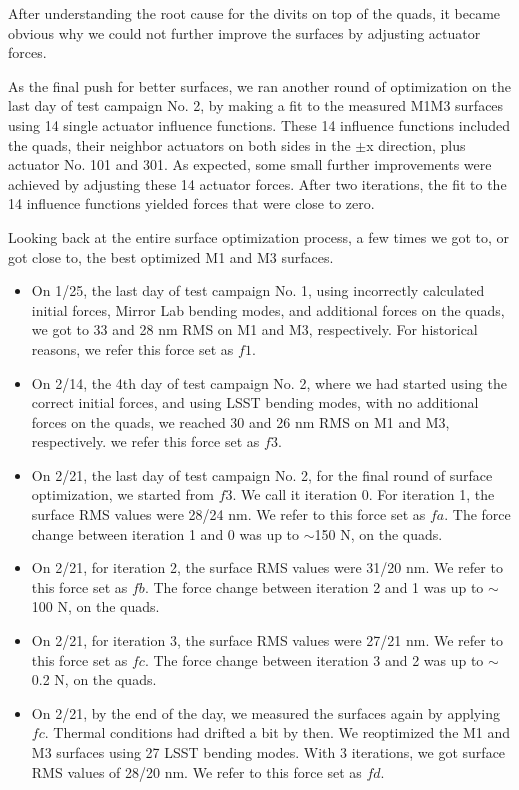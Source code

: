 \documentclass [twoside,openbib,12pt]{article}
\newcommand{\bitm}{\begin{itemize}}
\newcommand{\eitm}{\end{itemize}}
\begin{document}
 After understanding the root cause for the divits on top of the
 quads, it became obvious why we could not further improve the surfaces by
 adjusting actuator forces.
 
 As the final push for better surfaces, we ran another round of
 optimization on the last day of test campaign No. 2, by making a fit
 to the measured M1M3 surfaces using 14 single actuator influence
 functions.
 These 14 influence functions included the quads, their neighbor
 actuators on both sides in the $\pm$x direction, plus actuator
 No. 101 and 301.
 As expected, some small further improvements were achieved by
 adjusting these 14 actuator forces.
 After two iterations, the fit to the 14 influence functions yielded
 forces that were close to zero.

 
 Looking back at the entire surface optimization process, a few times
 we got to, or got close to, the best optimized M1 and M3 surfaces.
 \bitm
\item On 1/25, the last day of test campaign No. 1, using incorrectly
  calculated initial forces, Mirror Lab bending modes, and additional
  forces on the quads, we got to 33 and 28 nm RMS on M1 and M3,
  respectively. For historical reasons, we refer this force set as $f1$.
  \item On 2/14, the 4th day of test campaign No. 2, where we had
    started using the correct initial forces, and using LSST bending
    modes, with no additional forces on the quads, we reached 30 and
    26 nm RMS on M1 and M3,
    respectively. we refer this force set as $f3$.
    \item On 2/21, the last day of test campaign No. 2, for the final
      round of surface optimization, we started from $f3$. We call it
      iteration 0. For iteration 1, the surface RMS values were 28/24
      nm. We refer to this force set as $fa$. The force change between
      iteration 1 and 0 was up to $\sim$150 N, on the quads.
      \item On 2/21, for iteration 2, the surface RMS values were 31/20
      nm. We refer to this force set as $fb$. The force change between
      iteration 2 and 1 was up to $\sim$100 N, on the quads.
      \item On 2/21, for iteration 3, the surface RMS values were 27/21
      nm. We refer to this force set as $fc$. The force change between
      iteration 3 and 2 was up to $\sim$0.2 N, on the quads.
      \item On 2/21, by the end of the day, we measured the surfaces
        again by applying $fc$. Thermal conditions had drifted a bit
        by then. We reoptimized the M1 and M3 surfaces using 27 LSST
        bending modes. With 3 iterations, we got surface RMS values of
        28/20 nm. We refer to this force set as $fd$.
  \eitm
\end{document}
